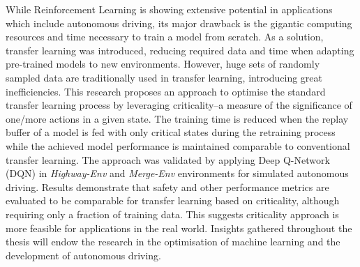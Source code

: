 
While Reinforcement Learning is showing extensive potential in applications which include autonomous driving, its major drawback is the gigantic computing resources and time necessary to train a model from scratch. As a solution, transfer learning was introduced, reducing required data and time when adapting pre-trained models to new environments. However, huge sets of randomly sampled data are traditionally used in transfer learning, introducing great inefficiencies. This research proposes an approach to optimise the standard transfer learning process by leveraging criticality--a measure of the significance of one/more actions in a given state. The training time is reduced when the replay buffer of a model is fed with only critical states during the retraining process while the achieved model performance is maintained comparable to conventional transfer learning. The approach was validated by applying Deep Q-Network (DQN) in \emph{Highway-Env} and \emph{Merge-Env} environments for simulated autonomous driving. Results demonstrate that safety and other performance metrics are evaluated to be comparable for transfer learning based on criticality, although requiring only a fraction of training data. This suggests criticality approach is more feasible for applications in the real world. Insights gathered throughout the thesis will endow the research in the optimisation of machine learning and the development of autonomous driving.